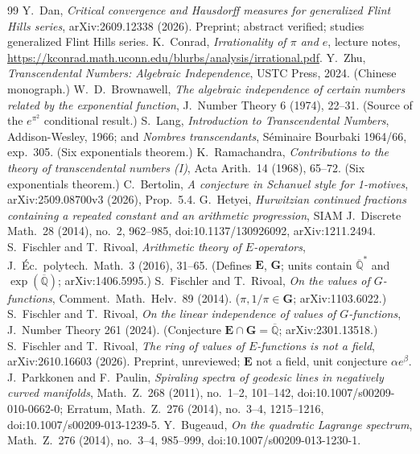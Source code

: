\documentclass[11pt]{amsart}
\theoremstyle{definition}
\theoremstyle{remark}
\numberwithin{equation}{section}
\newcommand{\Q}{\mathbb{Q}}
\newcommand{\ee}{e}
\begin{document}
\begin{thebibliography}{99}
 Y.~Dan, \emph{Critical convergence and Hausdorff measures for generalized Flint Hills series}, arXiv:2609.12338 (2026). Preprint; abstract verified; studies generalized Flint Hills series.
 K.~Conrad, \emph{Irrationality of $\pi$ and $e$}, lecture notes, \url{https://kconrad.math.uconn.edu/blurbs/analysis/irrational.pdf}.
 Y.~Zhu, \emph{Transcendental Numbers: Algebraic Independence}, USTC Press, 2024. (Chinese monograph.)
 W.~D.~Brownawell, \emph{The algebraic independence of certain numbers related by the exponential function}, J.~Number Theory 6 (1974), 22--31. (Source of the $\ee^{\pi^2}$ conditional result.)
 S.~Lang, \emph{Introduction to Transcendental Numbers}, Addison-Wesley, 1966; and \emph{Nombres transcendants}, S\'eminaire Bourbaki 1964/66, exp.~305. (Six exponentials theorem.)
 K.~Ramachandra, \emph{Contributions to the theory of transcendental numbers (I)}, Acta Arith.~14 (1968), 65--72. (Six exponentials theorem.)
 C.~Bertolin, \emph{A conjecture in Schanuel style for 1-motives}, arXiv:2509.08700v3 (2026), Prop.~5.4.
 G.~Hetyei, \emph{Hurwitzian continued fractions containing a repeated constant and an arithmetic progression}, SIAM J.~Discrete Math.~28 (2014), no.~2, 962--985, doi:10.1137/130926092, arXiv:1211.2494.
 S.~Fischler and T.~Rivoal, \emph{Arithmetic theory of $E$-operators}, J.~\'Ec.~polytech.~Math.~3 (2016), 31--65. (Defines $\mathbf{E}$, $\mathbf{G}$; units contain $\overline{\Q}^*$ and $\exp(\overline{\Q})$; arXiv:1406.5995.)
 S.~Fischler and T.~Rivoal, \emph{On the values of $G$-functions}, Comment.~Math.~Helv.~89 (2014). ($\pi,1/\pi\in\mathbf{G}$; arXiv:1103.6022.)
 S.~Fischler and T.~Rivoal, \emph{On the linear independence of values of $G$-functions}, J.~Number Theory 261 (2024). (Conjecture $\mathbf{E}\cap\mathbf{G}=\overline{\Q}$; arXiv:2301.13518.)
 S.~Fischler and T.~Rivoal, \emph{The ring of values of $E$-functions is not a field}, arXiv:2610.16603 (2026). Preprint, unreviewed; $\mathbf{E}$ not a field, unit conjecture $\alpha e^\beta$.
 J.~Parkkonen and F.~Paulin, \emph{Spiraling spectra of geodesic lines in negatively curved manifolds}, Math.~Z.~268 (2011), no.~1--2, 101--142, doi:10.1007/s00209-010-0662-0; Erratum, Math.~Z.~276 (2014), no.~3--4, 1215--1216, doi:10.1007/s00209-013-1239-5.
 Y.~Bugeaud, \emph{On the quadratic Lagrange spectrum}, Math.~Z.~276 (2014), no.~3--4, 985--999, doi:10.1007/s00209-013-1230-1.

\end{thebibliography}
\end{document}
